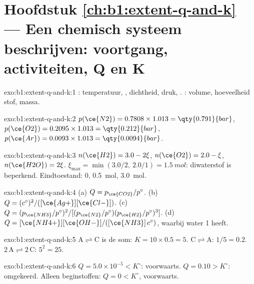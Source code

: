 \section*{Hoofdstuk \ref{ch:b1:extent-q-and-k} --- Een chemisch systeem beschrijven: voortgang, activiteiten, Q en K}

\begin{solution}{exo:b1:extent-q-and-k:1}
: temperatuur, , dichtheid, druk,
. : volume, hoeveelheid stof, massa.
\end{solution}

\begin{solution}{exo:b1:extent-q-and-k:2}
$p(\ce{N2}) = 0.7808 \times 1.013 = \qty{0.791}{bar}$, $p(\ce{O2}) =
0.2095 \times 1.013 = \qty{0.212}{bar}$, $p(\ce{Ar}) = 0.0093 \times 1.013
= \qty{0.0094}{bar}$.
\end{solution}


\begin{solution}{exo:b1:extent-q-and-k:3}
$n(\ce{H2}) = 3.0 - 2\xi$, $n(\ce{O2}) = 2.0 - \xi$, $n(\ce{H2O}) =
2\xi$. $\xi_{\max} = \min(3.0/2,\ 2.0/1) = \qty{1.5}{mol}$: diwaterstof
is beperkend. Eindtoestand:  0,  \qty{0.5}{mol}, 
\qty{3.0}{mol}.
\end{solution}

\begin{solution}{exo:b1:extent-q-and-k:4}
(a) $Q = p_{\ce{CO2}}/p^\circ$. (b) $Q = (c^\circ)^2/([\ce{Ag+}][\ce{Cl-}])$.
(c) $Q = (p_{\ce{NH3}}/p^\circ)^2/[(p_{\ce{N2}}/p^\circ)(p_{\ce{H2}}/p^\circ)^3]$.
(d) $Q = [\ce{NH4+}][\ce{OH-}]/([\ce{NH3}]\,c^\circ)$, waarbij water
 1 heeft.
\end{solution}

\begin{solution}{exo:b1:extent-q-and-k:5}
$\mathrm{A \rightleftharpoons C}$ is de som: $K = 10 \times 0.5 = 5$.
$\mathrm{C \rightleftharpoons A}$: $1/5 =
0.2$. $\mathrm{2\,A \rightleftharpoons 2\,C}$: $5^2 = 25$.
\end{solution}

\begin{solution}{exo:b1:extent-q-and-k:6}
$Q = 5.0 \times 10^{-5} < K^\circ$: voorwaarts. $Q = 0.10 > K^\circ$:
omgekeerd. Alleen beginstoffen: $Q = 0 < K^\circ$, voorwaarts.
\end{solution}

